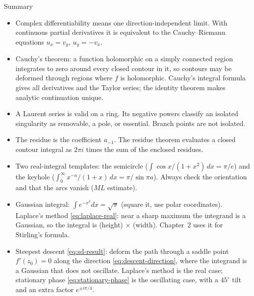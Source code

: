 \documentclass[11pt]{beamer}
\begin{document}
\begin{frame}[allowframebreaks=1.00]{Summary}
\footnotesize
\begin{itemize}
 \item Complex differentiability means one direction-independent limit. With continuous partial
       derivatives it is equivalent to the Cauchy--Riemann equations $u_x=v_y$, $u_y=-v_x$.
 \item Cauchy's theorem: a function holomorphic on a simply connected region integrates to zero
       around every closed contour in it, so contours may be deformed through regions where $f$ is
       holomorphic. Cauchy's integral
       formula gives all derivatives and the Taylor series; the identity theorem makes
       analytic continuation unique.
 \item A Laurent series is valid on a ring. Its negative powers classify an isolated
       singularity as removable, a pole, or essential. Branch points are not isolated.
 \item The residue is the coefficient $a_{-1}$. The residue theorem evaluates a closed contour
       integral as $2\pi i$ times the sum of the enclosed residues.
\end{itemize}
\par\framebreak\par
\begin{itemize}
 \item Two real-integral templates: the semicircle ($\int\cos x/(1+x^2)\,dx=\pi/e$) and the
       keyhole ($\int_0^\infty x^{-a}/(1+x)\,dx=\pi/\sin\pi a$). Always check the orientation and
       that the arcs vanish ($ML$ estimate).
 \item Gaussian integral: $\int e^{-x^2}dx=\sqrt\pi$ (square it, use polar coordinates).
       Laplace's method \eqref{eq:laplace-real}: near a sharp maximum the integrand is a Gaussian,
       so the integral is (height) $\times$ (width). Chapter~2 uses it for Stirling's formula.
 \item Steepest descent \eqref{eq:sd-result}: deform the path through a saddle point $f'(z_0)=0$ along
       the direction \eqref{eq:descent-direction}, where the integrand is a Gaussian that does not
       oscillate. Laplace's method is the real case; stationary phase \eqref{eq:stationary-phase} is
       the oscillating case, with a $45^\circ$ tilt and an extra factor $e^{\pm i\pi/4}$.
\end{itemize}
\end{frame}
\end{document}
